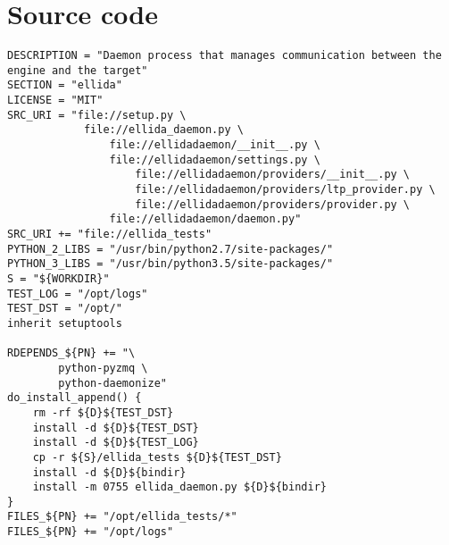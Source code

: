 \chapter*{Source code}
\begin{lstlisting}[caption = {Daemons Bitbake recipe}]
DESCRIPTION = "Daemon process that manages communication between the engine and the target"
SECTION = "ellida"
LICENSE = "MIT"
SRC_URI = "file://setup.py \
            file://ellida_daemon.py \
                file://ellidadaemon/__init__.py \
                file://ellidadaemon/settings.py \
                    file://ellidadaemon/providers/__init__.py \
                    file://ellidadaemon/providers/ltp_provider.py \
                    file://ellidadaemon/providers/provider.py \
                file://ellidadaemon/daemon.py"
SRC_URI += "file://ellida_tests"
PYTHON_2_LIBS = "/usr/bin/python2.7/site-packages/"
PYTHON_3_LIBS = "/usr/bin/python3.5/site-packages/"
S = "${WORKDIR}"
TEST_LOG = "/opt/logs"
TEST_DST = "/opt/"
inherit setuptools

RDEPENDS_${PN} += "\
        python-pyzmq \
        python-daemonize"
do_install_append() {
    rm -rf ${D}${TEST_DST}
    install -d ${D}${TEST_DST}
    install -d ${D}${TEST_LOG}
    cp -r ${S}/ellida_tests ${D}${TEST_DST}
    install -d ${D}${bindir}
    install -m 0755 ellida_daemon.py ${D}${bindir}
}
FILES_${PN} += "/opt/ellida_tests/*"
FILES_${PN} += "/opt/logs"
\end{lstlisting}
